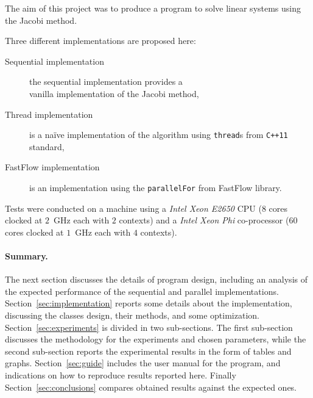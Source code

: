 The aim of this project was to produce a program to solve linear systems using the Jacobi method.

Three different implementations are proposed here:
\begin{description}
    \item[Sequential implementation] the sequential implementation provides a \\    
    vanilla implementation of the Jacobi method,
    \item[Thread implementation] is a na\"ive implementation of the algorithm using \lstinline+thread+s from \lstinline|C++11| standard,  
    \item[FastFlow implementation] is an implementation using the \lstinline+parallelFor+ from FastFlow library.
\end{description}

Tests were conducted on a machine using a \emph{Intel Xeon E2650} CPU ($8$ cores clocked at $2$~\si{\giga\hertz} each with $2$ contexts) and a \emph{Intel Xeon Phi} co-processor ($60$ cores clocked at $1$~\si{\giga\hertz} each with $4$ contexts).

\paragraph{Summary.} The next section discusses the details of program design, including an analysis of the expected performance of the sequential and parallel implementations.
Section~\ref{sec:implementation} reports some details about the implementation, discussing the classes design, their methods, and some optimization.
\alert{Section~\ref{sec:experiments} is divided in two sub-sections. 
The first sub-section discusses the methodology for the experiments and chosen parameters, while the second sub-section reports the experimental results in the form of tables and graphs.
Section~\ref{sec:guide} includes the user manual for the program, and indications on how to reproduce results reported here.
Finally Section~\ref{sec:conclusions} compares obtained results against the expected ones.}